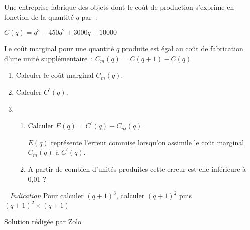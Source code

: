 
%
Une entreprise fabrique des objets dont le coût de production s'exprime en fonction de la quantité $q$ par~:
\par
$C\left(q\right)=q^{3}-450q^{2}+3000q+10000$
\par
Le coût marginal pour une quantité $q$ produite est égal au coût de fabrication d'une unité supplémentaire~: $C_{m}\left(q\right)=C\left(q+1\right)-C\left(q\right)$
\begin{enumerate}
     \item
     Calculer le coût marginal $C_{m}\left(q\right)$.
     \item
     Calculer $C^{\prime}\left(q\right)$.
     \item
     \begin{enumerate}[label=\alph*.]
          \item
          Calculer $E\left(q\right)=C^{\prime}\left(q\right)-C_{m}\left(q\right)$.
          \par
          $E\left(q\right)$ représente l'erreur commise lorsqu'on assimile le coût marginal $C_{m}\left(q\right)$ à $C^{\prime}\left(q\right)$.
          \item
          A partir de combien d'unités produites cette erreur est-elle inférieure à 0,01 ?
     \end{enumerate}
\end{enumerate}
~
\textit{Indication}
Pour calculer $\left(q+1\right)^{3}$, calculer $\left(q+1\right)^{2}$ puis $\left(q+1\right)^{2}\times \left(q+1\right)$
\begin{corrige}
     \par
{}%
     Solution rédigée par Zolo
     \par
     [pdf-embedder url="/wp-content/uploads/slides/cout-marginal/cout-marginal.pdf" width="676"]
\end{corrige}
